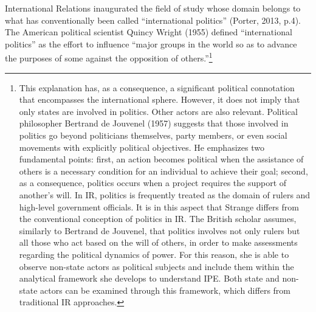 International Relations inaugurated the field of study whose domain belongs to what has conventionally been called ``international politics'' (Porter, 2013, p.4). The American political scientist Quincy Wright (1955) defined ``international politics'' as the effort to influence ``major groups in the world so as to advance the purposes of some against the opposition of others.''\footnote{This explanation has, as a consequence, a significant political connotation that encompasses the international sphere. However, it does not imply that only states are involved in politics. Other actors are also relevant. Political philosopher Bertrand de Jouvenel (1957) suggests that those involved in politics go beyond politicians themselves, party members, or even social movements with explicitly political objectives. He emphasizes two fundamental points: first, an action becomes political when the assistance of others is a necessary condition for an individual to achieve their goal; second, as a consequence, politics occurs when a project requires the support of another’s will. In IR, politics is frequently treated as the domain of rulers and high-level government officials. It is in this aspect that Strange differs from the conventional conception of politics in IR. The British scholar assumes, similarly to Bertrand de Jouvenel, that politics involves not only rulers but all those who act based on the will of others, in order to make assessments regarding the political dynamics of power. For this reason, she is able to observe non-state actors as political subjects and include them within the analytical framework she develops to understand IPE. Both state and non-state actors can be examined through this framework, which differs from traditional IR approaches.}

